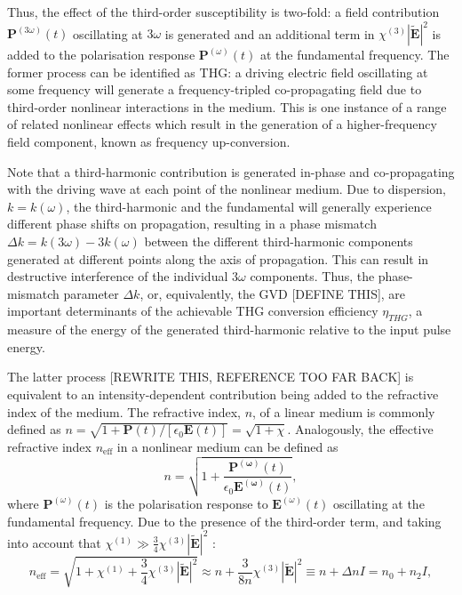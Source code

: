 \documentclass[a4paper]{jpconf}
\begin{document}
Thus, the effect of the third-order susceptibility is two-fold: a field contribution $\mathbf{P}^{(3\omega)}(t)$ oscillating at $3\omega$ is generated and an additional term in $\chi^{(3)} |\tilde{\mathbf{E}}|^2$ is added to the polarisation response  $\mathbf{P}^{(\omega)}(t)$ at the fundamental frequency. The former process can be identified as THG: a driving electric field oscillating at some frequency will generate a frequency-tripled co-propagating field due to third-order nonlinear interactions in the medium. This is one instance of a range of related nonlinear effects which result in the generation of a higher-frequency field component, known as frequency up-conversion. \par 
Note that a third-harmonic contribution is generated in-phase and co-propagating with the driving wave at each point of the nonlinear medium. Due to dispersion, $k=k(\omega)$, the third-harmonic and the fundamental will generally experience different phase shifts on propagation, resulting in a phase mismatch $\Delta k = k(3 \omega)- 3k (\omega)$ between the different third-harmonic components generated at different points along the axis of propagation. This can result in destructive interference of the individual $3\omega$ components. Thus, the phase-mismatch parameter $\Delta k$, or, equivalently, the GVD [DEFINE THIS], are important determinants of the achievable THG conversion efficiency $\eta_{THG}$, a measure of the energy of the generated third-harmonic relative to the input pulse energy.  \par 
The latter process [REWRITE THIS, REFERENCE TOO FAR BACK] is equivalent to an intensity-dependent contribution being added to the refractive index of the medium. The refractive index, $n$, of a linear medium is commonly defined as $n = \sqrt{1+ \mathbf{P}(t)/[\epsilon_0 \mathbf{E}(t)]} = \sqrt{1 + \chi}$. Analogously, the effective refractive index $n_{\text{eff}}$ in a nonlinear medium can be defined as
\begin{equation}
n = \sqrt{1+ \frac{\mathbf{P^{(\omega)}}(t)}{\epsilon_0 \mathbf{E^{(\omega)}}(t)}},
\end{equation}
where $\mathbf{P}^{(\omega)}(t)$ is the polarisation response to $\mathbf{E}^{(\omega)}(t)$ oscillating at the fundamental frequency. Due to the presence of the third-order term, and taking into account that $\chi^{(1)} \gg \frac{3}{4} \chi^{(3)} |\tilde{\mathbf{E}}|^2$ :
\begin{equation}
n_\text{eff} = \sqrt{1 + \chi^{(1)} + \frac{3}{4} \chi^{(3)} |\tilde{\mathbf{E}}|^2} \approx n + \frac{3}{8n} \chi^{(3)} |\tilde{\mathbf{E}}|^2 \equiv n + \Delta n I = n_0 + n_2 I,
\end{equation}
\end{document}
